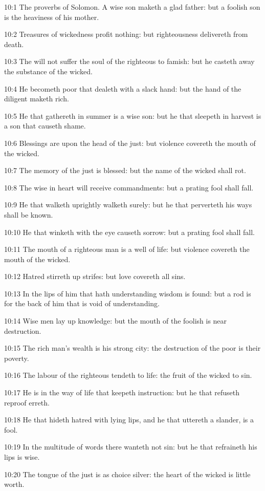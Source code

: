 10:1 The proverbs of Solomon. A wise son maketh a glad father: but a foolish son is the heaviness of his mother.

10:2 Treasures of wickedness profit nothing: but righteousness delivereth from death.

10:3 The \LORD will not suffer the soul of the righteous to famish: but he casteth away the substance of the wicked.

10:4 He becometh poor that dealeth with a slack hand: but the hand of the diligent maketh rich.

10:5 He that gathereth in summer is a wise son: but he that sleepeth in harvest is a son that causeth shame.

10:6 Blessings are upon the head of the just: but violence covereth the mouth of the wicked.

10:7 The memory of the just is blessed: but the name of the wicked shall rot.

10:8 The wise in heart will receive commandments: but a prating fool shall fall.

10:9 He that walketh uprightly walketh surely: but he that perverteth his ways shall be known.

10:10 He that winketh with the eye causeth sorrow: but a prating fool shall fall.

10:11 The mouth of a righteous man is a well of life: but violence covereth the mouth of the wicked.

10:12 Hatred stirreth up strifes: but love covereth all sins.

10:13 In the lips of him that hath understanding wisdom is found: but a rod is for the back of him that is void of understanding.

10:14 Wise men lay up knowledge: but the mouth of the foolish is near destruction.

10:15 The rich man's wealth is his strong city: the destruction of the poor is their poverty.

10:16 The labour of the righteous tendeth to life: the fruit of the wicked to sin.

10:17 He is in the way of life that keepeth instruction: but he that refuseth reproof erreth.

10:18 He that hideth hatred with lying lips, and he that uttereth a slander, is a fool.

10:19 In the multitude of words there wanteth not sin: but he that refraineth his lips is wise.

10:20 The tongue of the just is as choice silver: the heart of the wicked is little worth.

